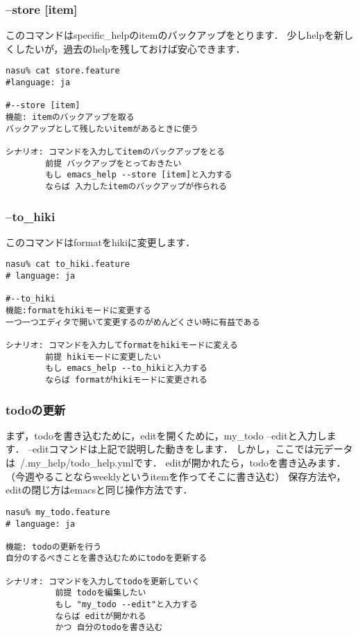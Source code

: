 \subsubsection{--store [item]}
このコマンドはspecific\_helpのitemのバックアップをとります．
少しhelpを新しくしたいが，過去のhelpを残しておけば安心できます．
\begin{lstlisting}[style=customRuby]
nasu% cat store.feature
#language: ja

#--store [item]
機能: itemのバックアップを取る
バックアップとして残したいitemがあるときに使う

シナリオ: コマンドを入力してitemのバックアップをとる
        前提 バックアップをとっておきたい
        もし emacs_help --store [item]と入力する
        ならば 入力したitemのバックアップが作られる
\end{lstlisting}
\subsubsection{--to\_hiki}
このコマンドはformatをhikiに変更します．
\begin{lstlisting}[style=customRuby]
nasu% cat to_hiki.feature
# language: ja

#--to_hiki
機能:formatをhikiモードに変更する
一つ一つエディタで開いて変更するのがめんどくさい時に有益である

シナリオ: コマンドを入力してformatをhikiモードに変える
        前提 hikiモードに変更したい
        もし emacs_help --to_hikiと入力する
        ならば formatがhikiモードに変更される
\end{lstlisting}
\subsubsection{todoの更新}
まず，todoを書き込むために，editを開くために，my\_todo --editと入力します．
--editコマンドは上記で説明した動きをします．
しかし，ここでは元データは~/.my\_help/todo\_help.ymlです．
editが開かれたら，todoを書き込みます．（今週やることならweeklyというitemを作ってそこに書き込む）
保存方法や，editの閉じ方はemacsと同じ操作方法です．
\begin{lstlisting}[style=customRuby]
nasu% my_todo.feature
# language: ja

機能: todoの更新を行う
自分のするべきことを書き込むためにtodoを更新する

シナリオ: コマンドを入力してtodoを更新していく
          前提 todoを編集したい
          もし "my_todo --edit"と入力する
          ならば editが開かれる
          かつ 自分のtodoを書き込む

\end{lstlisting}
